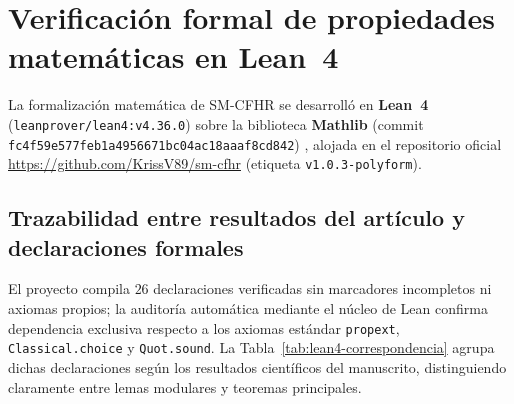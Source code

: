 \section{Verificación formal de propiedades matemáticas en Lean~4}\label{ap:lean4}

La formalización matemática de SM-CFHR se desarrolló en \textbf{Lean~4} (\texttt{leanprover/lean4:v4.36.0}) \cite{moura2021lean4} sobre la biblioteca \textbf{Mathlib} (commit \texttt{fc4f59e577feb1a4956671bc04ac18aaaf8cd842}) \cite{mathlib2020}, alojada en el repositorio oficial \url{https://github.com/KrissV89/sm-cfhr} (etiqueta \texttt{v1.0.3-polyform}).

\subsection{Trazabilidad entre resultados del artículo y declaraciones formales}

El proyecto compila $26$ declaraciones verificadas sin marcadores incompletos ni axiomas propios; la auditoría automática mediante el núcleo de Lean confirma dependencia exclusiva respecto a los axiomas estándar \texttt{propext}, \texttt{Classical.choice} y \texttt{Quot.sound}. La Tabla~\ref{tab:lean4-correspondencia} agrupa dichas declaraciones según los resultados científicos del manuscrito, distinguiendo claramente entre lemas modulares y teoremas principales.


